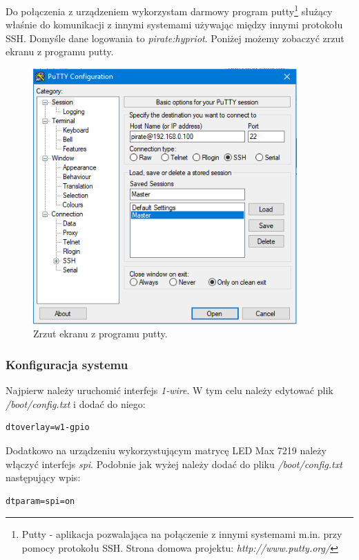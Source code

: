 \documentclass[12pt]{report}
\let\Oldsubsubsection\subsubsection
\renewcommand{\subsubsection}{\FloatBarrier\Oldsubsubsection}
\begin{document}
{Do połączenia z urządzeniem wykorzystam darmowy program putty\footnote{Putty - aplikacja pozwalająca na połączenie z innymi systemami m.in. przy pomocy protokołu SSH. Strona domowa projektu: \textit{http://www.putty.org/}} służący właśnie do komunikacji z innymi systemami używając między innymi protokołu SSH. Domyśle dane logowania to \textit{pirate:hypriot}. Poniżej możemy zobaczyć zrzut ekranu z programu putty.

\begin{figure}[h]
	\centering
	\includegraphics[width=0.9\textwidth]{images/putty.png}
	\caption{Zrzut ekranu z programu putty.}
\end{figure}
\FloatBarrier

\subsubsection{Konfiguracja systemu}
Najpierw należy uruchomić interfejs \textit{1-wire}. W tym celu należy edytować plik \textit{/boot/config.txt} i dodać do niego:

\begin{lstlisting}
dtoverlay=w1-gpio
\end{lstlisting}

Dodatkowo na urządzeniu wykorzystującym matrycę LED Max 7219 należy włączyć interfejs \textit{spi}. Podobnie jak wyżej należy dodać do pliku \textit{/boot/config.txt} następujący wpis:

\begin{lstlisting}
dtparam=spi=on
\end{lstlisting}

}
\end{document}
